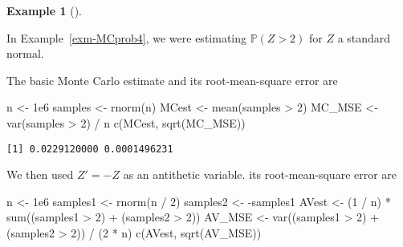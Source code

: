 \documentclass[
  letterpaper,
  DIV=11,
  numbers=noendperiod]{scrreprt}
\newenvironment{Shaded}{\begin{snugshade}}{\end{snugshade}}
\newcommand{\DecValTok}[1]{\textcolor[rgb]{0.68,0.00,0.00}{#1}}
\newcommand{\FloatTok}[1]{\textcolor[rgb]{0.68,0.00,0.00}{#1}}
\newcommand{\FunctionTok}[1]{\textcolor[rgb]{0.28,0.35,0.67}{#1}}
\newcommand{\NormalTok}[1]{\textcolor[rgb]{0.00,0.23,0.31}{#1}}
\newcommand{\OtherTok}[1]{\textcolor[rgb]{0.00,0.23,0.31}{#1}}
\newcommand{\SpecialCharTok}[1]{\textcolor[rgb]{0.37,0.37,0.37}{#1}}
\theoremstyle{plain}
\theoremstyle{definition}
\theoremstyle{definition}
\newtheorem{example}{Example}[chapter]
\theoremstyle{remark}
\begin{document}
\begin{example}[]\protect\hypertarget{exm-MCprob5}{}\label{exm-MCprob5}

In Example~\ref{exm-MCprob4}, we were estimating \(\mathbb P(Z > 2)\)
for \(Z\) a standard normal.

The basic Monte Carlo estimate and its root-mean-square error are

\begin{Shaded}
\begin{Highlighting}[]
\NormalTok{n }\OtherTok{\textless{}{-}} \FloatTok{1e6}
\NormalTok{samples }\OtherTok{\textless{}{-}} \FunctionTok{rnorm}\NormalTok{(n)}
\NormalTok{MCest   }\OtherTok{\textless{}{-}} \FunctionTok{mean}\NormalTok{(samples }\SpecialCharTok{\textgreater{}} \DecValTok{2}\NormalTok{)}
\NormalTok{MC\_MSE }\OtherTok{\textless{}{-}} \FunctionTok{var}\NormalTok{(samples }\SpecialCharTok{\textgreater{}} \DecValTok{2}\NormalTok{) }\SpecialCharTok{/}\NormalTok{ n}
\FunctionTok{c}\NormalTok{(MCest, }\FunctionTok{sqrt}\NormalTok{(MC\_MSE))}
\end{Highlighting}
\end{Shaded}

\begin{verbatim}
[1] 0.0229120000 0.0001496231
\end{verbatim}

We then used \(Z' = -Z\) as an antithetic variable. its root-mean-square
error are

\begin{Shaded}
\begin{Highlighting}[]
\NormalTok{n }\OtherTok{\textless{}{-}} \FloatTok{1e6}
\NormalTok{samples1 }\OtherTok{\textless{}{-}} \FunctionTok{rnorm}\NormalTok{(n }\SpecialCharTok{/} \DecValTok{2}\NormalTok{)}
\NormalTok{samples2 }\OtherTok{\textless{}{-}} \SpecialCharTok{{-}}\NormalTok{samples1}
\NormalTok{AVest }\OtherTok{\textless{}{-}}\NormalTok{ (}\DecValTok{1} \SpecialCharTok{/}\NormalTok{ n) }\SpecialCharTok{*} \FunctionTok{sum}\NormalTok{((samples1 }\SpecialCharTok{\textgreater{}} \DecValTok{2}\NormalTok{) }\SpecialCharTok{+}\NormalTok{ (samples2 }\SpecialCharTok{\textgreater{}} \DecValTok{2}\NormalTok{))}
\NormalTok{AV\_MSE }\OtherTok{\textless{}{-}} \FunctionTok{var}\NormalTok{((samples1 }\SpecialCharTok{\textgreater{}} \DecValTok{2}\NormalTok{) }\SpecialCharTok{+}\NormalTok{ (samples2 }\SpecialCharTok{\textgreater{}} \DecValTok{2}\NormalTok{)) }\SpecialCharTok{/}\NormalTok{ (}\DecValTok{2} \SpecialCharTok{*}\NormalTok{ n)}
\FunctionTok{c}\NormalTok{(AVest, }\FunctionTok{sqrt}\NormalTok{(AV\_MSE))}
\end{Highlighting}
\end{Shaded}


\end{example}
\end{document}
